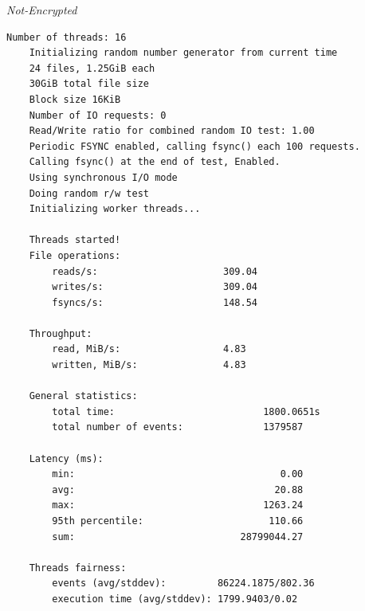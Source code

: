 \noindent\begin{minipage}[t]{0.45\linewidth}
  \centering
  \textit{Not-Encrypted}
  \begin{lstlisting}[basicstyle=\tiny,frame=single, label=cpu_test2]
    Number of threads: 16
    Initializing random number generator from current time
    24 files, 1.25GiB each
    30GiB total file size
    Block size 16KiB
    Number of IO requests: 0
    Read/Write ratio for combined random IO test: 1.00
    Periodic FSYNC enabled, calling fsync() each 100 requests.
    Calling fsync() at the end of test, Enabled.
    Using synchronous I/O mode
    Doing random r/w test
    Initializing worker threads...
    
    Threads started!
    File operations:
        reads/s:                      309.04
        writes/s:                     309.04
        fsyncs/s:                     148.54
    
    Throughput:
        read, MiB/s:                  4.83
        written, MiB/s:               4.83
    
    General statistics:
        total time:                          1800.0651s
        total number of events:              1379587
    
    Latency (ms):
        min:                                    0.00
        avg:                                   20.88
        max:                                 1263.24
        95th percentile:                      110.66
        sum:                             28799044.27
    
    Threads fairness:
        events (avg/stddev):         86224.1875/802.36
        execution time (avg/stddev): 1799.9403/0.02
  \end{lstlisting}
\end{minipage}

